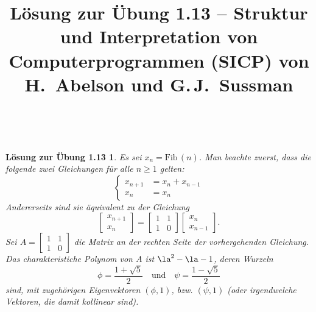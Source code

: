 \documentclass[a4paper,11pt,reqno]{amsart}
\theoremstyle{uremark}
\newtheorem*{loes}{L\"osung zur \"Ubung 1.13}
\begin{document}
\title[]{L\"osung zur \"Ubung 1.13 -- Struktur und Interpretation von
Computerprogrammen (SICP) von H.~Abelson und G.\,J.~Sussman}
\author{\href{https://github.com/pzuehlke}{}}
\maketitle
\


\begin{loes} 
    Es sei $ x_n = \text{Fib}\,(n) $. Man beachte zuerst, dass die folgende
    zwei Gleichungen f\"ur alle $ n \ge 1 $ gelten:
    \begin{equation*}%
        \begin{cases}
            x_{n + 1} & = x_{n} + x_{n - 1} \\
            x_n & = x_n
        \end{cases}
    \end{equation*}
    Andererseits sind sie \"aquivalent zu der Gleichung
    \begin{equation*}%
        \begin{bmatrix}
            x_{n + 1} \\
            x_n
        \end{bmatrix} =\begin{bmatrix}
            1 & 1 \\
            1 & 0 
        \end{bmatrix}
        \begin{bmatrix}
            x_n \\
            x_{n - 1}
        \end{bmatrix}.
        \end{equation*}
        Sei $ A = \begin{bmatrix}
            1 & 1 \\
            1 & 0 
        \end{bmatrix} $ die Matrix an der rechten Seite der vorhergehenden
        Gleichung. Das
        charakteristiche Polynom von $ A $ ist $ \la^2 - \la - 1 $, deren
        Wurzeln
        \begin{equation*}%
            \phi = \frac{1 + \sqrt{5}}{2} \quad \text{und} \quad \psi = \frac{1
            - \sqrt{5}}{2}
        \end{equation*}
        sind, mit zugeh\"origen Eigenvektoren $ (\phi, 1) $, bzw. $ (\psi, 1) $
        (oder irgendwelche Vektoren, die damit kollinear sind).


\end{loes}
\end{document}
